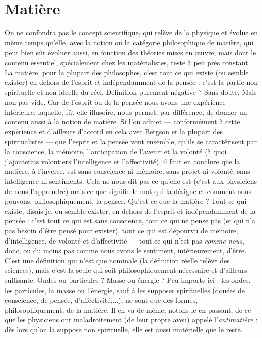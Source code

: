 \section{Matière}
On ne confondra pas le concept scientifique, qui relève de la
physique et évolue en même temps qu’elle, avec la notion ou la
catégorie philosophique de matière, qui peut bien sûr évoluer aussi, en fonction
des théories mises en œuvre, mais dont le contenu essentiel, spécialement chez
les matérialistes, reste à peu près constant. La matière, pour la plupart des philosophes,
c’est tout ce qui existe (ou semble exister) en dehors de l’esprit et
indépendamment de la pensée : c’est la partie non spirituelle et non idéelle du
réel. Définition purement négative ? Sans doute. Mais non pas vide. Car de
l'esprit ou de la pensée nous avons une expérience intérieure, laquelle, fût-elle
illusoire, nous permet, par différence, de donner un contenu aussi à la notion
de matière. Si l’on admet — conformément à cette expérience et d’ailleurs
d'accord en cela avec Bergson et la plupart des spiritualistes — que l'esprit et la
pensée vont ensemble, qu’ils se caractérisent par la conscience, la mémoire,
l’anticipation de l’avenir et la volonté (à quoi j’ajouterais volontiers l’intelligence
et l’affectivité), il faut en conclure que la matière, à l'inverse, est sans
conscience ni mémoire, sans projet ni volonté, sans intelligence ni sentiments.
Cela ne nous dit pas ce qu’elle est (c’est aux physiciens de nous l’apprendre)
mais ce que signifie le mot qui la désigne et comment nous pouvons, philosophiquement,
la penser. Qu'est-ce que la matière ? Tout ce qui existe, disais-je,
ou semble exister, en dehors de l'esprit et indépendamment de la pensée : c’est
tout ce qui est sans conscience, tout ce qui ne pense pas (et qui n’a pas besoin
d’être pensé pour exister), tout ce qui est dépourvu de mémoire, d’intelligence,
de volonté et d’affectivité — tout ce qui n’est pas {\it comme nous}, donc, ou du
moins pas comme nous avons le sentiment, intérieurement, d’être. C’est une
définition qui n’est que nominale (la définition réelle relève des sciences), mais
c’est la seule qui soit philosophiquement nécessaire et d’ailleurs suffisante.
Ondes ou particules ? Masse ou énergie ? Peu importe ici : les ondes, les particules,
la masse ou l’énergie, sauf à les supposer spirituelles (douées de conscience,
de pensée, d’affectivité....), ne sont que des formes, philosophiquement,
de la matière. Il en va de même, notons-le en passant, de ce que les physiciens
ont maladroitement (de leur propre aveu) appelé l’{\it antimatière} : dès lors qu’on
la suppose non spirituelle, elle est aussi matérielle que le reste.

